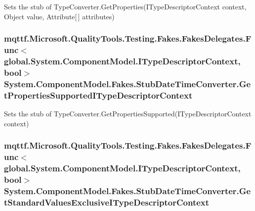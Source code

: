 Sets the stub of Type\-Converter.\-Get\-Properties(\-I\-Type\-Descriptor\-Context context, Object value, Attribute\mbox{[}$\,$\mbox{]} attributes)

\hypertarget{class_system_1_1_component_model_1_1_fakes_1_1_stub_date_time_converter_ab31afd6c23248837e1b86a96a629f88c}{
\subsubsection[{Get\-Properties\-Supported\-I\-Type\-Descriptor\-Context}]{\setlength{\rightskip}{0pt plus 5cm}mqttf.\-Microsoft.\-Quality\-Tools.\-Testing.\-Fakes.\-Fakes\-Delegates.\-Func$<$global.\-System.\-Component\-Model.\-I\-Type\-Descriptor\-Context, bool$>$ System.\-Component\-Model.\-Fakes.\-Stub\-Date\-Time\-Converter.\-Get\-Properties\-Supported\-I\-Type\-Descriptor\-Context}}\label{class_system_1_1_component_model_1_1_fakes_1_1_stub_date_time_converter_ab31afd6c23248837e1b86a96a629f88c}


Sets the stub of Type\-Converter.\-Get\-Properties\-Supported(\-I\-Type\-Descriptor\-Context context)

\hypertarget{class_system_1_1_component_model_1_1_fakes_1_1_stub_date_time_converter_a6b765f057402e7817757ab33532e41ff}{
\subsubsection[{Get\-Standard\-Values\-Exclusive\-I\-Type\-Descriptor\-Context}]{\setlength{\rightskip}{0pt plus 5cm}mqttf.\-Microsoft.\-Quality\-Tools.\-Testing.\-Fakes.\-Fakes\-Delegates.\-Func$<$global.\-System.\-Component\-Model.\-I\-Type\-Descriptor\-Context, bool$>$ System.\-Component\-Model.\-Fakes.\-Stub\-Date\-Time\-Converter.\-Get\-Standard\-Values\-Exclusive\-I\-Type\-Descriptor\-Context}}\label{class_system_1_1_component_model_1_1_fakes_1_1_stub_date_time_converter_a6b765f057402e7817757ab33532e41ff}


